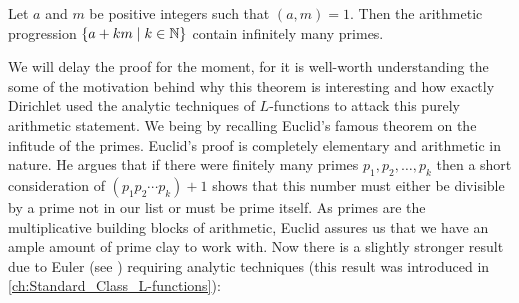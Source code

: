       \begin{theorem}\label{thm:Dirichlet's_theorem_on_primes_in_arithmetic_progressions}
        Let $a$ and $m$ be positive integers such that $(a,m) = 1$. Then the arithmetic progression $\{a+km \mid k \in \mathbb{N}\}$ contain infinitely many primes.
      \end{theorem}

      We will delay the proof for the moment, for it is well-worth understanding the some of the motivation behind why this theorem is interesting and how exactly Dirichlet used the analytic techniques of $L$-functions to attack this purely arithmetic statement. We being by recalling Euclid's famous theorem on the infitude of the primes. Euclid's proof is completely elementary and arithmetic in nature. He argues that if there were finitely many primes $p_{1},p_{2},\ldots,p_{k}$ then a short consideration of $(p_{1}p_{2} \cdots p_{k})+1$ shows that this number must either be divisible by a prime not in our list or must be prime itself. As primes are the multiplicative building blocks of arithmetic, Euclid assures us that we have an ample amount of prime clay to work with. Now there is a slightly stronger result due to Euler (see \cite{euler1744variae}) requiring analytic techniques (this result was introduced in \cref{ch:Standard_Class_L-functions}):

